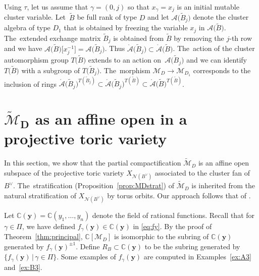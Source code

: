 \documentclass[pdftex]{sigma}%
\def\C{{\mathbb C}}
\def\A{{\mathcal{A}}}
\def\Ao{{\mathring{\A}}}
\def\tB{{\tilde B}}
\def\M{{\mathcal{M}}}
\def\tM{{\widetilde {\mathcal{M}}}}
\def\tB{{\tilde B}}
\def\y{{\mathbf y}}
\def\N{{\mathcal{N}}}
\numberwithin{equation}{section}
\begin{document}
\bigskip{} %
Using $\tau$, let us assume that $\gamma = (0,j)$ so that $x_\gamma = x_j$ is an initial mutable cluster variable. Let~$\tB$ be full rank of type $D$ and let $\A\big(\tB_j\big)$ denote the cluster algebra of type $D_1$ that is obtained by freezing the variable $x_j$ in $\A\big(\tB\big)$. The~extended exchange matrix $\tB_j$ is obtained from $\tB$ by removing the $j$-th row and we have $\A\big(\tB\big)\big[x_j^{-1}\big] = \A\big(\tB_j\big)$. Thus $\Ao\big(\tB_j\big) \subset \Ao\big(\tB\big)$. The~action of the cluster automorphism group $T\big(\tB\big)$ extends to an action on~$\A\big(\tB_j\big)$ and we can identify $T\big(\tB\big)$ with a subgroup of $T\big(\tB_j\big)$. The~morphism $\M_{D} \to \M_{D_1}$ corresponds to the inclusion of rings $\Ao\big(\tB_j\big)^{T(\tB_j)} \subset \Ao\big(\tB_j\big)^{T(\tB)} \subset \Ao\big(\tB\big)^{T(\tB)}$.

\section[MD as an affine open in a projective toric variety]
{$\boldsymbol{\tM_D}$ as an affine open in a projective toric variety}

In this section, we show that the partial compactification $\tM_D$ is an affine open subspace of the projective toric variety $X_{\N(B^\vee)}$ associated to the cluster fan of $B^\vee$. The~stratification (Proposition~\ref{prop:MDstrat}) of $\tM_D$ is inherited from the natural stratification of $X_{\N(B^\vee)}$ by torus orbits. Our approach follows that of \cite{AHL}.

\bigskip{}
Let $\C(\y) = \C(y_1,\dots,y_n)$ denote the field of rational functions. Recall that for $\gamma \in \Pi$, we have defined $f_\gamma(\y) \in \C(\y)$ in \eqref{eq:fy}.
By the proof of Theorem~\ref{thm:principal}, $\C[\M_D]$ is isomorphic to the subring of $\C(\y)$ generated by $f_\gamma(\y)^{\pm 1}$. Define $R_B \subset \C(\y)$ to be the subring generated by $\{f_\gamma(\y) \,|\, \gamma \in \Pi\}$. Some examples of $f_\gamma(\y)$ are computed in Examples~\ref{ex:A3} and~\ref{ex:B3}.
\end{document}
